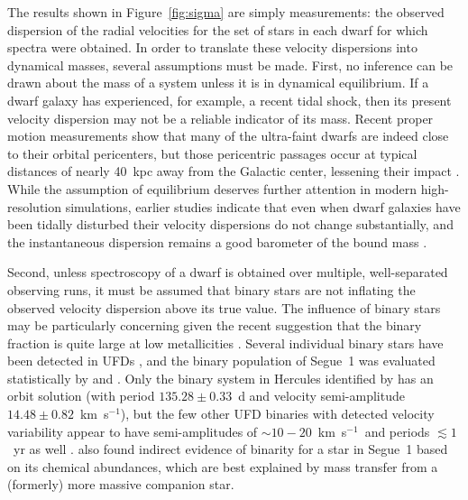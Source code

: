 \documentclass[a4paper]{ar-1col}
\newcommand{\kms}         {km~s$^{-1}$}
\begin{document}
The results shown in Figure~\ref{fig:sigma} are simply measurements:
the observed dispersion of the radial velocities for the set of stars
in each dwarf for which spectra were obtained.  In order to translate
these velocity dispersions into dynamical masses, several assumptions
must be made.  First, no inference can be drawn about the mass of a
system unless it is in dynamical equilibrium.  If a dwarf galaxy has
experienced, for example, a recent tidal shock, then its present
velocity dispersion may not be a reliable indicator of its mass.
Recent proper motion measurements show that many of the ultra-faint
dwarfs are indeed close to their orbital pericenters, but those
pericentric passages occur at typical distances of nearly 40~kpc away
from the Galactic center, lessening their impact \citep{simon18}.
While the assumption of equilibrium deserves further attention in
modern high-resolution simulations, earlier studies indicate that even
when dwarf galaxies have been tidally disturbed their velocity
dispersions do not change substantially, and the instantaneous
dispersion remains a good barometer of the bound mass
\citep{oh95,pp95,munoz08}.

Second, unless spectroscopy of a dwarf is obtained over multiple,
well-separated observing runs, it must be assumed that binary stars
are not inflating the observed velocity dispersion above its true
value.  The influence of binary stars may be particularly concerning
given the recent suggestion that the binary fraction is quite large at
low metallicities \citep{moe18}.  Several individual binary stars have
been detected in UFDs
\citep[e.g.,][]{frebel10,koposov11,koch14,ji16b,kirby17,li18}, and the
binary population of Segue~1 was evaluated statistically by
\citet{martinez11} and \citet{simon11}.  Only the binary system in
Hercules identified by \citet{koch14} has an orbit solution (with
period $135.28 \pm 0.33$~d and velocity semi-amplitude $14.48 \pm
0.82$~\kms), but the few other UFD binaries with detected velocity
variability appear to have semi-amplitudes of $\sim10-20$~\kms\ and
periods $\lesssim1$~yr as well \citep{ji16b,kirby17,li18}.
\citet{fsk14} also found indirect evidence of binarity for a star in
Segue~1 based on its chemical abundances, which are best explained by
mass transfer from a (formerly) more massive companion star.
\end{document}
